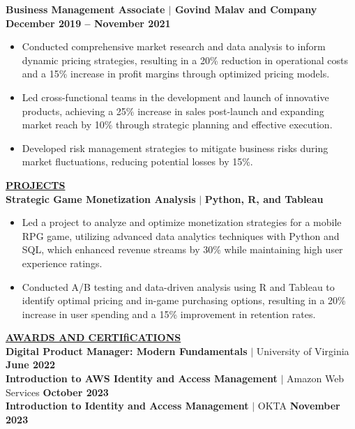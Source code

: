 \documentclass{article}
\begin{document}
\noindent \textbf{Business Management Associate $\mid$ Govind Malav and Company} \hfill \textbf{December 2019 – November 2021}
\begin{itemize}[noitemsep,nolistsep,leftmargin=*]
    \item {\small Conducted comprehensive market research and data analysis to inform dynamic pricing strategies, resulting in a 20\% reduction in operational costs and a 15\% increase in profit margins through optimized pricing models.}
   \item {\small Led cross-functional teams in the development and launch of innovative products, achieving a 25\% increase in sales post-launch and expanding market reach by 10\% through strategic planning and effective execution.}
    \item {\small Developed risk management strategies to mitigate business risks during market fluctuations, reducing potential losses by 15\%.}

\end{itemize}

\vspace{2mm}
\noindent \textbf{\underline{PROJECTS}} \\ 
\textbf{Strategic Game Monetization Analysis} $\mid$ \textbf{Python, R, and Tableau}
\begin{itemize}[noitemsep,nolistsep,leftmargin=*]
\item {\small Led a project to analyze and optimize monetization strategies for a mobile RPG game, utilizing advanced data analytics techniques with Python and SQL, which enhanced revenue streams by 30\% while maintaining high user experience ratings.}
\item {\small Conducted A/B testing and data-driven analysis using R and Tableau to identify optimal pricing and in-game purchasing options, resulting in a 20\% increase in user spending and a 15\% improvement in retention rates.}
\end{itemize}
\vspace{2mm}
\noindent \textbf{\underline{AWARDS AND CERTIfiCATIONS}} \\
\noindent \textbf{Digital Product Manager: Modern Fundamentals} $\mid$ University of Virginia  \hfill \textbf{June 2022}\\
\noindent \textbf{Introduction to AWS Identity and Access Management} $\mid$ Amazon Web Services \hfill \textbf{October 2023}\\
\noindent \textbf{Introduction to Identity and Access Management} $\mid$ OKTA \hfill \textbf{November 2023}
\end{document}

